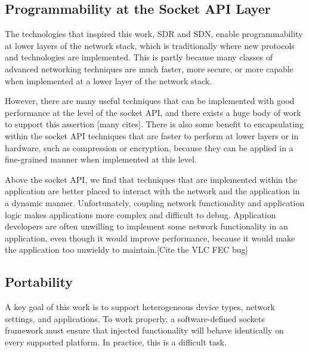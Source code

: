 \subsection{Programmability at the Socket API Layer}
\label{subsec:overview-layer}


The technologies that inspired this work, SDR and SDN, enable programmability at 
lower layers of the network stack, which is traditionally where new protocols
and technologies are implemented.
This is partly because many classes of advanced networking 
techniques
are much faster, more secure, or more capable when implemented 
at a lower layer of the network stack. 

However, there are many useful techniques 
that can be implemented with good performance at the level of the socket API, 
and there exists a huge body of work to support this assertion [many cites]. 
There is also some benefit to encapsulating within the socket API techniques 
that are faster to perform at lower layers or in hardware, such 
as compression or encryption, because they can be applied in a fine-grained 
manner when implemented at this level.

Above the socket API, we find that techniques that are implemented 
within the application are better 
placed to interact with the network and the application in a dynamic manner.
Unfortunately, coupling network functionality and application logic makes 
applications more complex and difficult to debug.
Application developers are often unwilling to implement some network functionality 
in an application, even though it would improve performance, because it would 
make the application too unwieldy to maintain.[Cite the VLC FEC bug]


\subsection{Portability}
\label{subsec:overview-portability}

A key goal of this work is to support heterogeneous device types, network settings, 
and applications. To work properly, a software-defined sockets framework must ensure 
that injected functionality will behave identically on every supported platform.
In practice, this is a difficult task.

